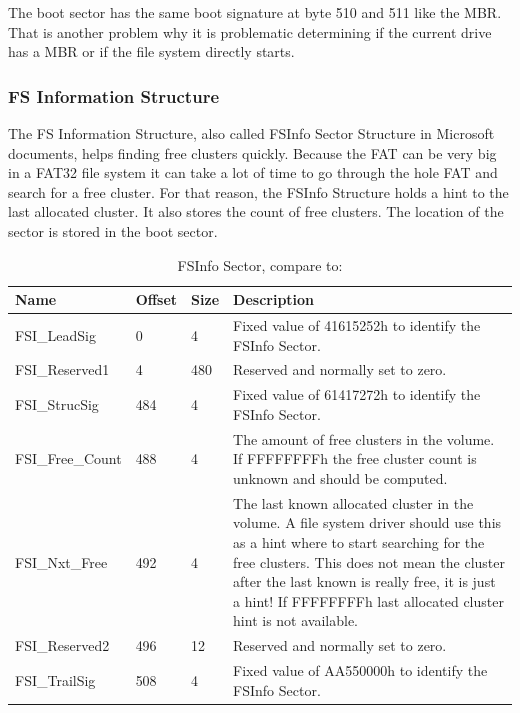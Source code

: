 The boot sector has the same boot signature at byte 510 and 511 like the MBR. That is another problem why it is problematic determining if the current drive has a MBR or if the file system directly starts.

\newpage

\subsubsection{FS Information Structure}

The FS Information Structure, also called FSInfo Sector Structure in Microsoft documents, helps finding free clusters quickly. Because the FAT can be very big in a FAT32 file system it can take a lot of time to go through the hole FAT and search for a free cluster. For that reason, the FSInfo Structure holds a hint to the last allocated cluster. It also stores the count of free clusters. The location of the sector is stored in the boot sector.

\begin{table}[!ht]
\caption{FSInfo Sector, compare to: \cite{fatgen103}}
\centering
\begin{tabular}{|l|l|l|p{9cm}|}
\hline\hline
\textbf{Name} & \textbf{Offset} & \textbf{Size} & \textbf{Description}\\ \hline
FSI\_LeadSig & 0 & 4 & Fixed value of 41615252h to identify the FSInfo Sector. \\ \hline
FSI\_Reserved1 & 4 & 480 & Reserved and normally set to zero. \\ \hline
FSI\_StrucSig & 484 & 4 & Fixed value of 61417272h to identify the FSInfo Sector. \\ \hline
FSI\_Free\_Count & 488 & 4 & The amount of free clusters in the volume. If FFFFFFFFh the free cluster count is unknown and should be computed. \\ \hline
FSI\_Nxt\_Free & 492 & 4 & The last known allocated cluster in the volume. A file system driver should use this as a hint where to start searching for the free clusters. This does not mean the cluster after the last known is really free, it is just a hint! If FFFFFFFFh last allocated cluster hint is not available. \\ \hline
FSI\_Reserved2 & 496 & 12 & Reserved and normally set to zero. \\ \hline
FSI\_TrailSig & 508 & 4 & Fixed value of AA550000h to identify the FSInfo Sector. \\ \hline
\end{tabular}
\label{table:fat_fs_info}
\end{table}

